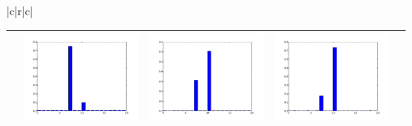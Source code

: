 \documentclass[twoside,11pt]{article}
\begin{document}
\begin{table}[t]
\begin{center}
{\begin{tabular}{|c|r|c|}
\begin{tabular}{ccccc}
&
\includegraphics[width=\barw\textwidth]{visualize_dist_paMedLDAave_0/0_512} &
\includegraphics[width=\barw\textwidth]{visualize_dist_paMedLDAave_0/0_4096} &
\includegraphics[width=\barw\textwidth]{visualize_dist_paMedLDAave_0/0_11269} \\
\hline
\end{tabular} \\


\end{tabular}}
\end{center}
\end{table}
\end{document}
